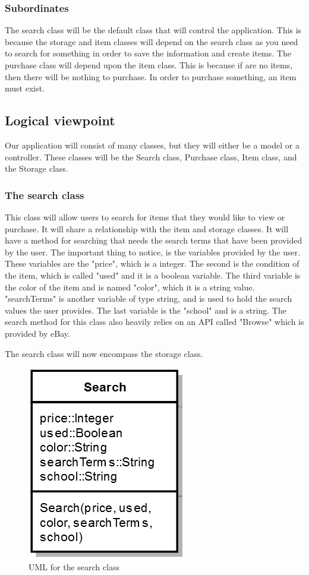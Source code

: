 \documentclass[journal,compsoc, 10pt, draftclsnofoot, onecolumn]{IEEEtran}
\begin{document}
\subsubsection*{Subordinates}
The search class will be the default class that will control the application. 
This is because the storage and item classes will depend on the search class 
as you need to search for something in order to save the information and create 
items. The purchase class will depend upon the item class. This is because if 
are no items, then there will be nothing to purchase. In order to purchase 
something, an item must exist. 

\subsection{Logical viewpoint}
Our application will consist of many classes, but they will either be a model or 
a controller. These classes will be the Search class, Purchase class, Item class, 
and the Storage class.

\subsubsection*{The search class}
This class will allow users to search for items that they would like to view or 
purchase. It will share a relationship with the item and storage classes. It 
will have a method for searching that needs the search terms that have been 
provided by the user. The important thing to notice, is the variables provided 
by the user. These variables are the "price", which is a integer. The second is 
the condition of the item, which is called "used" and it is a boolean variable. 
The third variable is the color of the item and is named "color", which it is a 
string value. "searchTerms" is another variable of type string, and is used to 
hold the search values the user provides. The last variable is the "school" and 
is a string. The search method for this class also heavily relies on an API 
called "Browse" which is provided by eBay. \newline

The search class will now encompass the storage class. 

\begin{figure}[h]
\centering
\caption{UML for the search class}
\includegraphics[scale=.9]{searchUML}
\end{figure}
\FloatBarrier
\end{document}
